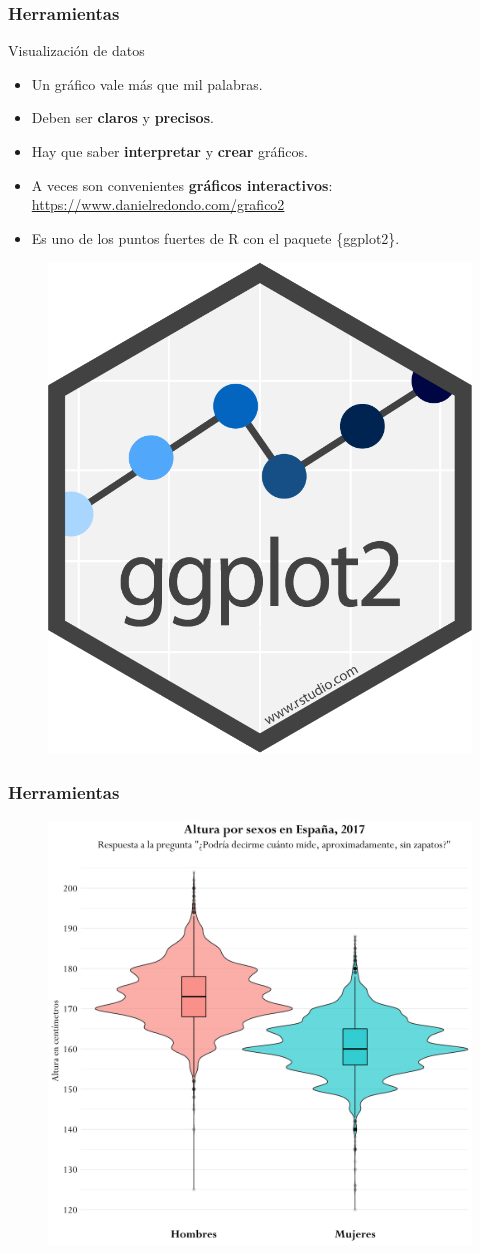 \documentclass{beamer}
\begin{document}
\begin{frame}\frametitle{Herramientas}
	\begin{block}{Visualización de datos}
		\begin{itemize}
			\item Un gráfico vale más que mil palabras.
			\item Deben ser \textbf{claros} y \textbf{precisos}.
			\item Hay que saber \textbf{interpretar} y \textbf{crear} gráficos.
			\item A veces son convenientes \textbf{gráficos interactivos}: \url{https://www.danielredondo.com/grafico2}
			\item Es uno de los puntos fuertes de R con el paquete  \{ggplot2\}.
		\end{itemize}
		\begin{figure}
			\centering
			\includegraphics[width=.20\textwidth]{images/ggplot2.png}
		\end{figure}
	\end{block}
\end{frame}


\begin{frame}\frametitle{Herramientas}
	\vspace{-5pt}
	\begin{figure}
		\centering
		\includegraphics[width=.68\textwidth]{images/25.png}
	\end{figure}
\end{frame}
\end{document}
